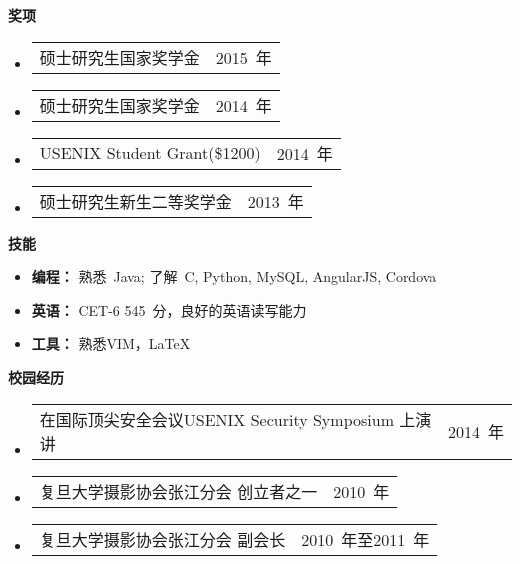 \documentclass[letterpaper,10pt]{article}
\makeatletter
\newcommand{\resheading}[1]{{\large \colorbox{mygrey}{\begin{minipage}{\textwidth}{\textbf{#1 \vphantom{p\^{E}}}}\end{minipage}}}}
\newcommand{\cvitem}[2]{
\begin{tabular*}{6.5in}{l@{\extracolsep{\fill}}r}
		#1 & #2 \\
\end{tabular*}\vspace{-1pt}}
\makeatother
\begin{document}
\resheading{奖项}
	\begin{itemize}
		\item \cvitem{硕士研究生国家奖学金}{2015~年}
		\item \cvitem{硕士研究生国家奖学金}{2014~年}
		\item \cvitem{USENIX Student Grant(\$1200)}{2014~年}
		\item \cvitem{硕士研究生新生二等奖学金}{2013~年}
	\end{itemize}


\resheading{{技能}}
	\begin{itemize}
		\item
            \textbf{编程：} 熟悉~Java; 了解~C, Python, MySQL, AngularJS, Cordova %
        \item
            \textbf{英语：} CET-6 545~分，良好的英语读写能力
        \item 
        	\textbf{工具：} 熟悉VIM，\LaTeX
	\end{itemize} %


\resheading{校园经历}
\begin{itemize}
	\item \cvitem{在国际顶尖安全会议USENIX Security Symposium 上演讲}{2014~年}
	\item \cvitem{复旦大学摄影协会张江分会 创立者之一}{2010~年}
	\item \cvitem{复旦大学摄影协会张江分会 副会长}{2010~年至2011~年}
\end{itemize}
\end{document}
